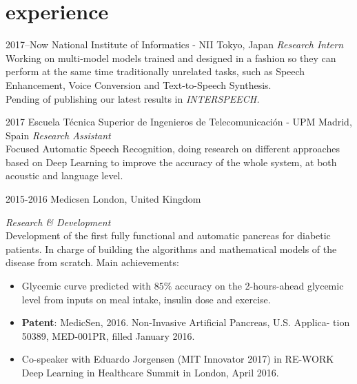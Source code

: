 \documentclass[]{friggeri-cv-a4}
\begin{document}
\section{experience}

\begin{entrylist}


\entry
{2017--Now}
{National Institute of Informatics - NII}
{Tokyo, Japan}
{\emph{Research Intern} \\
Working on multi-model models trained and designed in a fashion so they can perform at the same time traditionally unrelated tasks, such as Speech Enhancement, Voice Conversion and Text-to-Speech Synthesis.\\Pending of publishing our latest results in \emph{INTERSPEECH.}}


\entry
{2017}
{Escuela Técnica Superior de Ingenieros de Telecomunicación - UPM}
{Madrid, Spain}
{\emph{Research Assistant} \\
Focused Automatic Speech Recognition, doing research on different approaches based on Deep Learning to improve the accuracy of the whole system, at both acoustic and language level.}


\entry
{2015-2016}
{Medicsen}
{London, United Kingdom}
{\emph{Research \& Development} \\
Development of the first fully functional and automatic pancreas for diabetic patients. In charge of building the algorithms and mathematical models of the disease from scratch. Main achievements: 
\begin{itemize}
\item Glycemic curve predicted with $85\%$ accuracy on the 2-hours-ahead glycemic level from inputs on meal intake, insulin dose and exercise.
\item \textbf{Patent}: MedicSen, 2016. Non-Invasive Artificial Pancreas, U.S. Applica-
tion 50389, MED-001PR, filled January 2016.
\item Co-speaker with Eduardo Jorgensen (MIT Innovator 2017) in RE-WORK Deep Learning
in Healthcare Summit in London, April 2016.
\end{itemize}
}

\end{entrylist}

\end{document}

